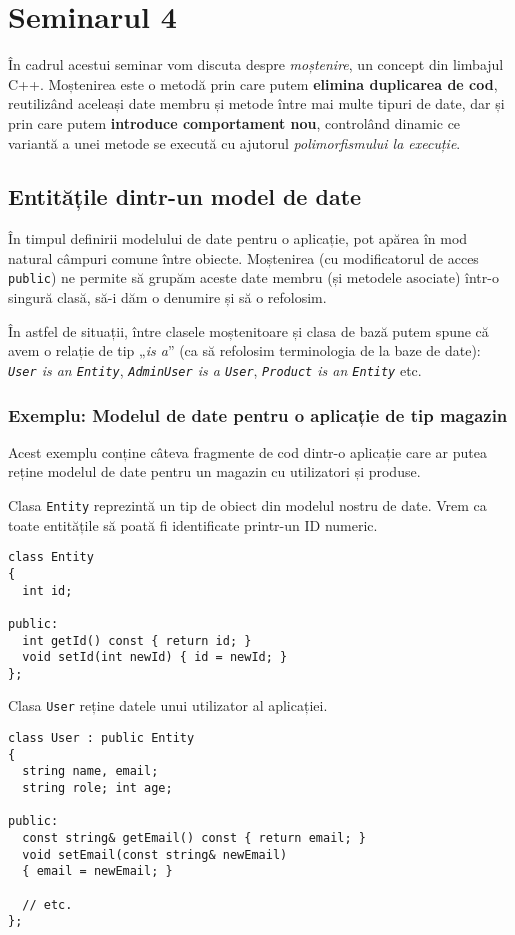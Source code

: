 \section*{Seminarul 4}

În cadrul acestui seminar vom discuta despre \emph{moștenire}, un concept din limbajul C++. Moștenirea este o metodă prin care putem \textbf{elimina duplicarea de cod}, reutilizând aceleași date membru și metode între mai multe tipuri de date, dar și prin care putem \textbf{introduce comportament nou}, controlând dinamic ce variantă a unei metode se execută cu ajutorul \emph{polimorfismului la execuție}.

\subsection*{Entitățile dintr-un model de date}

În timpul definirii modelului de date pentru o aplicație, pot apărea în mod natural câmpuri comune între obiecte. Moștenirea (cu modificatorul de acces \texttt{public}) ne permite să grupăm aceste date membru (și metodele asociate) într-o singură clasă, să-i dăm o denumire și să o refolosim.

În astfel de situații, între clasele moștenitoare și clasa de bază putem spune că avem o relație de tip „\emph{is a}” (ca să refolosim terminologia de la baze de date): \textit{\texttt{User} is an \texttt{Entity}}, \textit{\texttt{AdminUser} is a \texttt{User}}, \textit{\texttt{Product} is an \texttt{Entity}} etc.

\subsubsection*{Exemplu: Modelul de date pentru o aplicație de tip magazin}

Acest exemplu conține câteva fragmente de cod dintr-o aplicație care ar putea reține modelul de date pentru un magazin cu utilizatori și produse.

Clasa \texttt{Entity} reprezintă un tip de obiect din modelul nostru de date. Vrem ca toate entitățile să poată fi identificate printr-un ID numeric.
\begin{lstlisting}
class Entity
{ 
  int id;

public:
  int getId() const { return id; }
  void setId(int newId) { id = newId; }
};
\end{lstlisting}

Clasa \texttt{User} reține datele unui utilizator al aplicației.
\begin{lstlisting}
class User : public Entity
{
  string name, email;
  string role; int age;

public:
  const string& getEmail() const { return email; }
  void setEmail(const string& newEmail) 
  { email = newEmail; }

  // etc.
};
\end{lstlisting}


